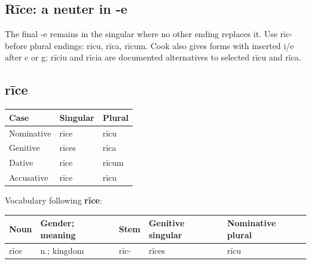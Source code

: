 \subsection*{Rīce: a neuter in -e}

The final -e remains in the singular where no other ending replaces it. Use rīc- before plural endings: rīcu, rīca, rīcum. Cook also gives forms with inserted i/\allowbreak{}e after c or g; rīciu and rīcia are documented alternatives to selected rīcu and rīca.

\subsection*{rīce}

\par\begingroup
\fontsize{10.5}{13.2}\selectfont
\setlength{\LTleft}{0pt}\setlength{\LTright}{\fill}
\noindent
\begin{tabular}{@{}>{\raggedright\arraybackslash}p{39.46mm}>{\raggedright\arraybackslash}p{39.46mm}>{\raggedright\arraybackslash}p{39.46mm}@{}}
\toprule
\textbf{Case} & \textbf{Singular} & \textbf{Plural} \\
\midrule
Nominative & rīce & rīcu \\
Genitive & rīces & rīca \\
Dative & rīce & rīcum \\
Accusative & rīce & rīcu \\
\bottomrule
\end{tabular}
\par\endgroup

Vocabulary following \textbf{rīce}:

\par\begingroup
\fontsize{10.5}{13.2}\selectfont
\setlength{\LTleft}{0pt}\setlength{\LTright}{\fill}
\noindent
\begin{tabular}{@{}>{\raggedright\arraybackslash}p{20.21mm}>{\raggedright\arraybackslash}p{21.42mm}>{\raggedright\arraybackslash}p{20.21mm}>{\raggedright\arraybackslash}p{24.35mm}>{\raggedright\arraybackslash}p{26.57mm}@{}}
\toprule
\textbf{Noun} & \textbf{Gender; meaning} & \textbf{Stem} & \textbf{Genitive singular} & \textbf{Nominative plural} \\
\midrule
rīce & n.; kingdom & rīc- & rīces & rīcu \\
\bottomrule
\end{tabular}
\par\endgroup

